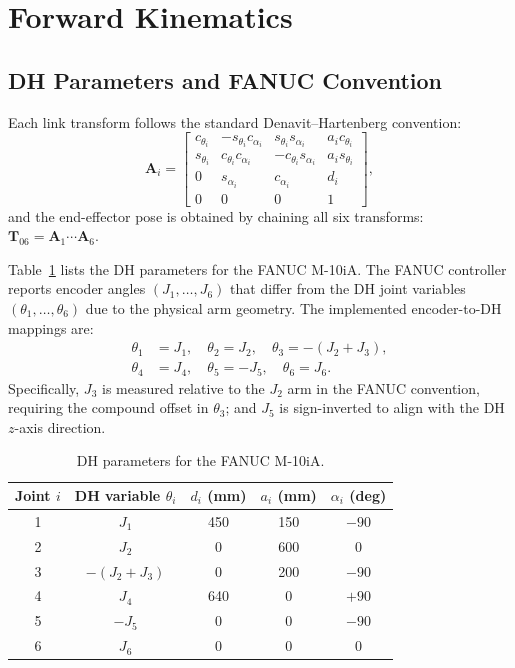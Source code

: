 \documentclass[conference]{IEEEtran}
\begin{document}
\section{Forward Kinematics}

\subsection{DH Parameters and FANUC Convention}
Each link transform follows the standard Denavit--Hartenberg convention:
\begin{equation}
\mathbf{A}_i =
\begin{bmatrix}
c_{\theta_i} & -s_{\theta_i}c_{\alpha_i} & s_{\theta_i}s_{\alpha_i} & a_i c_{\theta_i}\\
s_{\theta_i} &  c_{\theta_i}c_{\alpha_i} &-c_{\theta_i}s_{\alpha_i} & a_i s_{\theta_i}\\
0            & s_{\alpha_i}              & c_{\alpha_i}              & d_i\\
0            & 0                         & 0                         & 1
\end{bmatrix},
\label{eq:dh}
\end{equation}
and the end-effector pose is obtained by chaining all six transforms: $\mathbf{T}_{06}=\mathbf{A}_1\cdots\mathbf{A}_6$.

Table~\ref{tab:dh} lists the DH parameters for the FANUC M-10iA.
The FANUC controller reports encoder angles $(J_1,\ldots,J_6)$ that differ from the DH joint variables $(\theta_1,\ldots,\theta_6)$ due to the physical arm geometry.
The implemented encoder-to-DH mappings are:
\begin{align}
\theta_1 &= J_1, \quad
\theta_2  = J_2, \quad
\theta_3  = -(J_2 + J_3), \nonumber\\
\theta_4 &= J_4, \quad
\theta_5  = -J_5, \quad
\theta_6  = J_6. \label{eq:fanucmap}
\end{align}
Specifically, $J_3$ is measured relative to the $J_2$ arm in the FANUC convention, requiring the compound offset in $\theta_3$; and $J_5$ is sign-inverted to align with the DH $z$-axis direction.

\begin{table}[t]
\centering
\caption{DH parameters for the FANUC M-10iA.}
\label{tab:dh}
\begin{tabular}{c c c c c}
\toprule
Joint $i$ & DH variable $\theta_i$ & $d_i$ (mm) & $a_i$ (mm) & $\alpha_i$ (deg)\\
\midrule
1 & $J_1$            & 450 & 150 & $-90$ \\
2 & $J_2$            &   0 & 600 &    0  \\
3 & $-(J_2{+}J_3)$  &   0 & 200 & $-90$ \\
4 & $J_4$            & 640 &   0 & $+90$ \\
5 & $-J_5$           &   0 &   0 & $-90$ \\
6 & $J_6$            &   0 &   0 &    0  \\
\bottomrule
\end{tabular}
\end{table}
\end{document}
